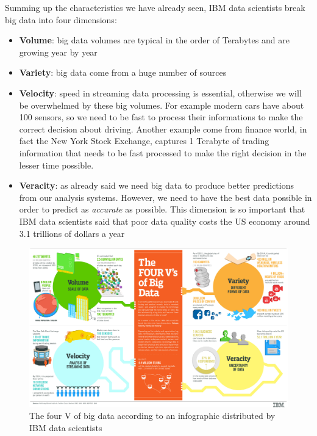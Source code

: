 Summing up the characteristics we have already seen, IBM data scientists break big data into four dimensions:
\begin{itemize}
 \item \textbf{Volume}: big data volumes are typical in the order of Terabytes and are growing year by year
 \item \textbf{Variety}: big data come from a huge number of sources
 \item \textbf{Velocity}: speed in streaming data processing is essential, otherwise we will be overwhelmed by these big volumes. For example modern cars have about 100 sensors, so we need to be fast to process their informations to make the correct decision about driving. Another example come from finance world, in fact the New York Stock Exchange, captures 1 Terabyte of trading information that needs to be fast processed to make the right decision in the lesser time possible.
 \item \textbf{Veracity}: as already said we need big data to produce better predictions from our analysis systems. However, we need to have the best data possible in order to predict as \textit{accurate} as possible. This dimension is so important that IBM data scientists said that poor data quality costs the US economy around 3.1 trillions of dollars a year
\end{itemize}

\begin{figure}[htb] %
   \centering
   \includegraphics[width=1.0\linewidth]{images/4-Vs-of-big-data.jpg}\hfill
   \caption[The four V of big data]{The four V of big data according to an infographic distributed by IBM data scientists}
   \label{fig:fourV}
\end{figure}

